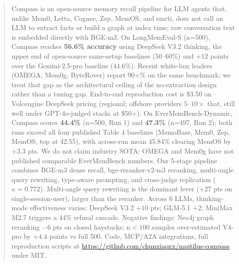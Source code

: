 
\begin{abstract}
Compass is an open-source memory recall pipeline for LLM agents that,
unlike Mem0, Letta, Cognee, Zep, MemOS, and smrti, does not call an LLM
to extract facts or build a graph at index time; raw conversation text
is embedded directly with BGE-m3. On LongMemEval-S (n=500), Compass
reaches \textbf{56.6\% accuracy} using DeepSeek V3.2 thinking, the
upper end of open-source same-setup baselines (50--60\%) and $+12$
points over the Gemini-2.5-pro baseline (44.6\%). Recent white-box
leaders (OMEGA, Mem0g, ByteRover) report 90+\% on the same benchmark;
we treat that gap as the architectural ceiling of the no-extraction
design rather than a tuning gap. End-to-end reproduction cost is
\$3.50 on Volcengine DeepSeek pricing (regional; offshore providers
$5$--$10\times$ that, still well under GPT-4o-judged stacks at \$50+).
On EverMemBench-Dynamic, Compass scores \textbf{44.4\%} (n=500, Run 1)
and \textbf{47.3\%} (n=497, Run 2); both runs exceed all four published
Table 4 baselines (MemoBase, Mem0, Zep, MemOS, top at 42.55), with
across-run mean 45.84\% clearing MemOS by $+$3.3 pts. We do not claim
industry SOTA: OMEGA and Mem0g have not published comparable
EverMemBench numbers. Our 5-stage pipeline combines BGE-m3 dense recall,
bge-reranker-v2-m3 reranking, multi-angle query rewriting, type-aware
prompting, and cross-judge replication ($\kappa{=}0.772$). Multi-angle
query rewriting is the dominant lever ($+27$ pts on
single-session-user), larger than the reranker. Across 6 LLMs,
thinking-mode effectiveness varies: DeepSeek V3.2 $+10$ pts; GLM-5.1
$+2$; MiniMax M2.7 triggers a 44\% refusal cascade. Negative findings:
Neo4j graph reranking $-6$ pts on closed haystacks; n${<}100$ samples
over-estimated V4-pro by $+4.4$ points vs full 500. Code, MCP/A2A
integrations, full reproduction scripts at
\url{https://github.com/chunxiaoxx/nautilus-compass} under MIT.
\end{abstract}
